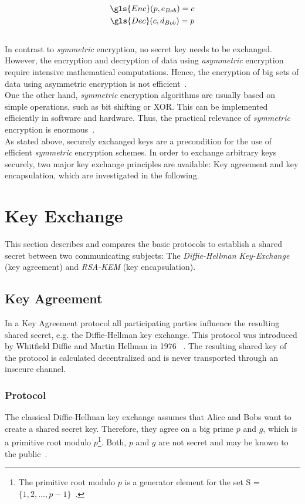 \begin{align*}
\gls{Enc}(p, e_{Bob}) = c\\
\gls{Dec}(c, d_{Bob}) = p
\end{align*}
\\
In contrast to \textit{symmetric} encryption, no secret key needs to be exchanged. However, the encryption and decryption of data using \textit{asymmetric} encryption require intensive mathematical computations. Hence, the encryption of big sets of data using asymmetric encryption is not efficient~\parencite{ITSicherheit}.\\
One the other hand, \textit{symmetric} encryption algorithms are usually based on simple operations, such as bit shifting or XOR. This can be implemented efficiently in software and hardware. Thus, the practical relevance of \textit{symmetric} encryption is enormous~\parencite{ITSicherheit}.
\\
As stated above, securely exchanged keys are a precondition for the use of efficient \textit{symmetric} encryption schemes. In order to exchange arbitrary keys securely, two major key exchange principles are available: Key agreement and key encapsulation, which are investigated in the following.

\section{Key Exchange}
This section describes and compares the basic protocols to establish a shared secret between two communicating subjects: The \textit{Diffie-Hellman Key-Exchange} (key agreement) and \textit{RSA-KEM} (key encapsulation).

\subsection{Key Agreement}

In a Key Agreement protocol all participating parties influence the resulting shared secret, e.g. the Diffie-Hellman key exchange. This protocol was introduced by Whitfield Diffie and Martin Hellman in 1976 ~\parencite{diffie1976new}. The resulting shared key of the protocol is calculated decentralized and is never transported through an insecure channel.

\subsubsection{Protocol}

The classical Diffie-Hellman key exchange assumes that Alice and Bobs want to create a shared secret key. Therefore, they agree on a big prime $p$ and $g$, which is a primitive root modulo $p$\footnote{The primitive root modulo $p$ is a generator element for the set S = $\{1, 2, ... , p-1\}$~\parencite{ITSicherheit}.}. Both, $p$ and $g$ are not secret and may be known to the public~\parencite{watjen2018kryptographie}.

